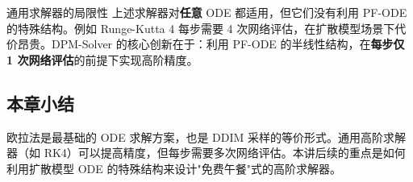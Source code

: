\begin{warningbox}{通用求解器的局限性}
上述求解器对\textbf{任意} ODE 都适用，但它们没有利用 PF-ODE 的特殊结构。例如 Runge-Kutta 4 每步需要 4 次网络评估，在扩散模型场景下代价昂贵。DPM-Solver 的核心创新在于：利用 PF-ODE 的半线性结构，在\textbf{每步仅 1 次网络评估}的前提下实现高阶精度。
\end{warningbox}

\subsection{本章小结}

欧拉法是最基础的 ODE 求解方案，也是 DDIM 采样的等价形式。通用高阶求解器（如 RK4）可以提高精度，但每步需要多次网络评估。本讲后续的重点是如何利用扩散模型 ODE 的特殊结构来设计"免费午餐"式的高阶求解器。


